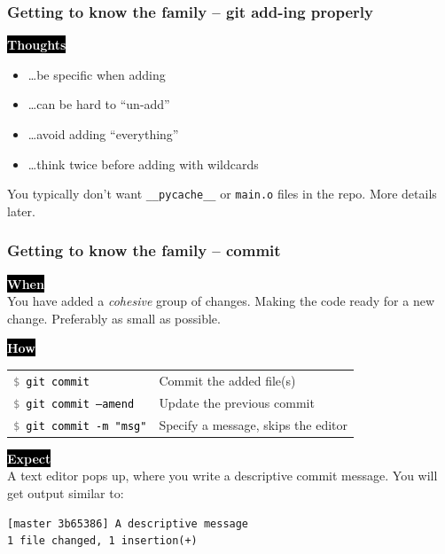 \documentclass{beamer}
\newcommand{\keyword}[1]{\hspace{-1.0em}\colorbox{black}{\textcolor{white}{\textbf{#1}\vphantom{Ep}}}\vspace{0.2em}} %
\newcommand{\command}[1]{\colorbox{black!90!white!10!}{\vphantom{Ep}\texttt{\textcolor{gray}{\$} \textcolor{black}{#1}}}}
\begin{document}
\begin{frame}
  \frametitle{Getting to know the family -- git add-ing properly}

  \keyword{Thoughts}
  \begin{itemize}[<+->]
    \item \dots be specific when adding
    \item \dots can be hard to ``un-add''
    \item \dots avoid adding ``everything''
    \item \dots think twice before adding with wildcards
  \end{itemize}

  \pause
  \vspace{1em}

  You typically don't want \texttt{\_\_pycache\_\_} or \texttt{main.o} files in
  the repo. More details later.

\end{frame}

\begin{frame}[fragile]
  \frametitle{Getting to know the family -- commit}
  \keyword{When}\\
    You have added a \emph{cohesive} group of changes. Making
    the code ready for a new change. Preferably as small as possible.
  \vspace{0.5em}

  \keyword{How}\\
  \hspace{-0.95em}
  \begin{tabular}{ll}
    \command{git commit} & Commit the added file(s) \\
    \command{git commit --amend} & Update the previous commit \\
    \command{git commit -m "msg"} & Specify a message, skips the editor \\
  \end{tabular}
  \vspace{0.5em}

  \keyword{Expect}\\
  A text editor pops up, where you write a descriptive commit message. You will get
  output similar to: \\
\begin{verbatim}
[master 3b65386] A descriptive message
1 file changed, 1 insertion(+)
\end{verbatim}

\end{frame}
\end{document}
